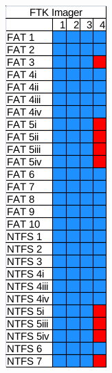 \begin{figure}[h!]
\begin{subfigure}{0.3\linewidth}
    \end{subfigure}
    ~
    \begin{subfigure}{0.3\linewidth}
        \includegraphics[width=\linewidth]{fig/ftk_results.png}
    \end{subfigure}
    

\end{figure}
